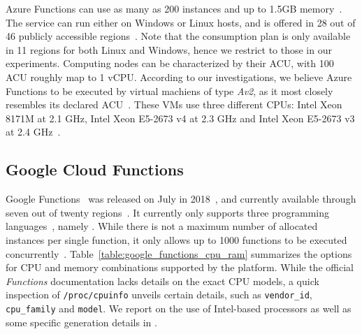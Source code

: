Azure Functions can use as many as 200 instances and up to 1.5GB memory~\cite{AzureFunctionsPlans}. 
The service can run either on Windows or Linux hosts, and is offered in 28 out of 46 publicly accessible regions~\cite{AzureRegions}.
Note that the consumption plan is only available in 11 regions for both Linux and Windows, hence we restrict to those in our experiments.
Computing nodes can be characterized by their \gls{ACU}, with 100 ACU roughly map to 1 \gls{vCPU}.
According to our investigations, we believe Azure Functions to be executed by virtual machiens of type \textit{Av2}, as it most closely resembles its declared \gls{ACU}~\cite{AzureFunctionsVMs}. 
These \gls{VM}s use three different \gls{CPU}s: Intel Xeon 8171M at 2.1 \gls{GHz}, Intel Xeon E5-2673 v4 at 2.3 \gls{GHz} and Intel Xeon E5-2673 v3 at 2.4 \gls{GHz}~\cite{AzureFunctionsVMs}.

\subsection{Google Cloud Functions}\label{sec:ss:google}
Google Functions~\cite{GoogleFunctions} was released on July in 2018~\cite{GoogleFunctionsReleases}, and currently available through seven out of twenty regions~\cite{GoogleFunctionsLocations}.
It currently only supports three programming languages~\cite{GoogleFunctionsLanguages}, namely . 
While there is not a maximum number of allocated instances per single function, it only allows up to 1000 functions to be executed concurrently~\cite{GoogleFunctionsQuotas}.
Table~\ref{table:google_functions_cpu_ram} summarizes the options for CPU and memory combinations supported by the platform\cite{GoogleFunctionsPricing}.
While the official \emph{Functions} documentation lacks details on the exact CPU models, a quick inspection of \texttt{/proc/cpuinfo} unveils certain details, such as \texttt{vendor\_id}, \texttt{cpu\_family} and \texttt{model}.
We report on the use of Intel-based processors as well as some specific generation details in .

